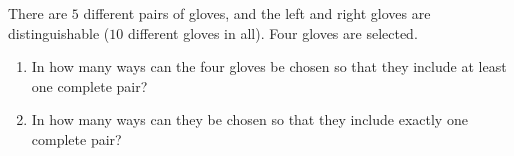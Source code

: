 There are $5$ different pairs of gloves, and the left and right gloves are distinguishable ($10$ different gloves in all). Four gloves are selected.
\begin{enumerate}
\item[(a)] In how many ways can the four gloves be chosen so that they include at least one complete pair?
\item[(b)] In how many ways can they be chosen so that they include exactly one complete pair?
\end{enumerate}
